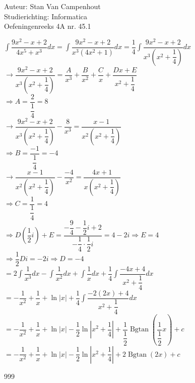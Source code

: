 \documentclass[a4paper]{article}
\begin{document}
  
\noindent \large Auteur: Stan Van Campenhout \\
\noindent \large Studierichting:  Informatica\\
\noindent \large Oefeningenreeks 4A nr. 45.1\\

\medskip

\normalsize

$ \displaystyle\int\dfrac{9x^2-x+2}{4x^5+x^3}dx = \displaystyle\int\dfrac{9x^2-x+2}{x^3\left(4x^2+1\right)}dx 
= \dfrac{1}{4}\displaystyle\int\dfrac{9x^2-x+2}{x^3\left(x^2+\dfrac{1}{4}\right)}dx $\\

$ \rightarrow\dfrac{9x^2-x+2}{x^3\left(x^2+\dfrac{1}{4}\right)} = \dfrac{A}{x^3}+\dfrac{B}{x^2}+\dfrac{C}{x}+\dfrac{Dx+E}{x^2+\dfrac{1}{4}} $\\

$ \Rightarrow A = \dfrac{2}{\dfrac{1}{4}} = 8 $\\

$ \rightarrow \dfrac{9x^2-x+2}{x^3\left(x^2+\dfrac{1}{4}\right)} -  \dfrac{8}{x^3} = \dfrac{x-1}{x^2\left(x^2+\dfrac{1}{4}\right)} $\\

$ \Rightarrow B = \dfrac{-1}{\dfrac{1}{4}} = -4 $\\

$ \rightarrow \dfrac{x-1}{x^2\left(x^2+\dfrac{1}{4}\right)} - \dfrac{-4}{x^2} = \dfrac{4x+1}{x\left(x^2+\dfrac{1}{4}\right)} $\\

$ \Rightarrow C = \dfrac{1}{\dfrac{1}{4}} = 4 $\\

$ \Rightarrow D\left(\dfrac{1}{2}i\right)+E = \dfrac{-\dfrac{9}{4}-\dfrac{1}{2}i+2}{-\dfrac{1}{4}\cdot\dfrac{1}{2}i} = 4-2i \Rightarrow E = 4 $\\

$ \Rightarrow \dfrac{1}{2}Di = -2i \Rightarrow D = -4 $\\

$ = 2\displaystyle\int\dfrac{1}{x^3}dx-\displaystyle\int\dfrac{1}{x^2}dx+\displaystyle\int\dfrac{1}{x}dx+\dfrac{1}{4}\displaystyle\int\dfrac{-4x+4}{x^2+\dfrac{1}{4}}dx $\\

$ = -\dfrac{1}{x^2}+\dfrac{1}{x}+\ln|x|+\dfrac{1}{4}\displaystyle\int\dfrac{-2\left(2x\right)+4}{x^2+\dfrac{1}{4}}dx $\\

$ = -\dfrac{1}{x^2}+\dfrac{1}{x}+\ln|x|-\dfrac{1}{2}\ln\left|x^2+\dfrac{1}{4}\right|+\dfrac{1}{\dfrac{1}{2}}\operatorname{Bgtan}\left(\dfrac{1}{\dfrac{1}{2}}x\right)+c $\\ 

$ = -\dfrac{1}{x^2}+\dfrac{1}{x}+\ln|x|-\dfrac{1}{2}\ln\left|x^2+\dfrac{1}{4}\right|+2\operatorname{Bgtan}\left(2x\right)+c $\\ 

\begin{thebibliography}{999}
\end{thebibliography}
\end{document}
